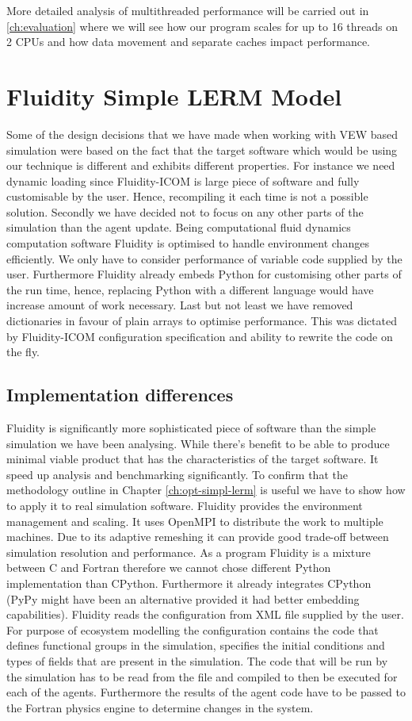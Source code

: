 \documentclass[12pt, a4paper]{report}
\begin{document}
More detailed analysis of multithreaded performance will be carried out in
\ref{ch:evaluation} where we will see how our program scales for up to 16
threads on 2 CPUs and how data movement and separate caches impact performance.

\chapter{Fluidity Simple LERM Model}\label{ch:thread-fluid}
Some of the design decisions that we have made when working with VEW based
simulation were based on the fact that the target software which would
be using our technique is different and exhibits different properties.
For instance we need dynamic loading since Fluidity-ICOM is large
piece of software and fully customisable by the user. Hence, recompiling
it each time is not a possible solution. Secondly we have decided
not to focus on any other parts of the simulation than the agent update.
Being computational fluid dynamics computation software Fluidity is
optimised to handle environment changes efficiently. We only have to consider
performance of variable code supplied by the user. Furthermore Fluidity
already embeds Python for customising other parts of the run time, hence,
replacing Python with a different language would have increase amount
of work necessary. Last but not least we have removed dictionaries in favour
of plain arrays to optimise performance. This was dictated by Fluidity-ICOM
configuration specification and ability to rewrite the code on the fly.

\section{Implementation differences}\label{sec:impl-diff}
Fluidity is significantly more sophisticated piece of software than the simple
simulation we have been analysing. While there's benefit to be able to
produce minimal viable product that has the characteristics of the target
software. It speed up analysis and benchmarking significantly. To confirm
that the methodology outline in Chapter \ref{ch:opt-simpl-lerm} is useful we have to
show how to apply it to real simulation software. Fluidity provides the
environment management and scaling. It uses OpenMPI to distribute the
work to multiple machines. Due to its adaptive remeshing it can provide
good trade-off between simulation resolution and performance. As a program
Fluidity is a mixture between C and Fortran therefore we cannot chose
different Python implementation than CPython. Furthermore it already
integrates CPython (PyPy might have been an alternative provided it
had better embedding capabilities). Fluidity reads the configuration from
XML file supplied by the user. For purpose of ecosystem modelling the
configuration contains the code that defines functional groups in the
simulation, specifies the initial conditions and types of fields that are
present in the simulation. The code that will be run by the simulation has
to be read from the file and compiled to then be executed for each of the agents.
Furthermore the results of the agent code have to be passed to the Fortran
physics engine to determine changes in the system.
\end{document}
